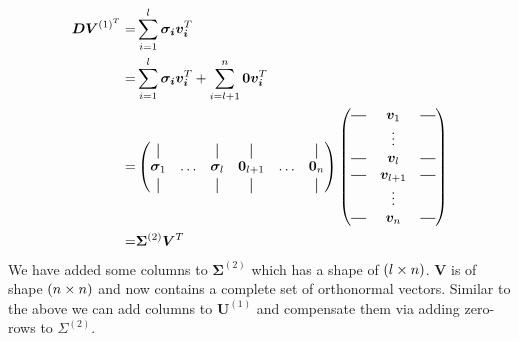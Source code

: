     \begin{align}
        \bm{DV}^{(1)^T} =& \sum_{i=1}^l \bm{\sigma_i} \bm{v_i}^T                                      \\
                        =& \sum_{i=1}^l \bm{\sigma_i} \bm{v_i}^T + \sum_{i=l+1}^n \bm{0} \bm{v_i}^T   \\
                        =& \begin{pmatrix}
                                \vertbar      &        & \vertbar      & \vertbar          &        & \vertbar      \\
                                \bm{\sigma}_1 & \hdots & \bm{\sigma}_l & \bm{0}_{l+1} & \hdots & \bm{0}_n \\
                                \vertbar      &        & \vertbar      & \vertbar          &        & \vertbar 
                            \end{pmatrix}
                            \begin{pmatrix}
                                \horzbar & \bm{v}_1 & \horzbar \\
                                        & \vdots   &           \\
                                \horzbar & \bm{v}_l & \horzbar \\
                                \horzbar & \bm{v}_{l+1} & \horzbar \\
                                         & \vdots   &          \\
                                \horzbar & \bm{v}_n & \horzbar 
                            \end{pmatrix} \\
                        =& \bm{\Sigma}^{(2)} \bm{V}^T
    \end{align}
    We have added some columns to $\bm{\Sigma}^{(2)}$ which has a shape of $(l \times n)$. 
    $\bm{V}$ is of shape $(n \times n)$ and now contains a complete set of orthonormal vectors.
    Similar to the above we can add columns to $\bm{U}^{(1)}$ and compensate them via adding
    zero-rows to $\Sigma^{(2)}$.

